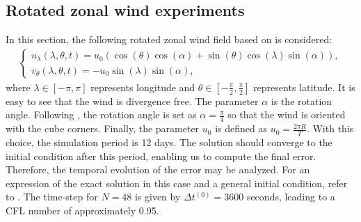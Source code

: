 \documentclass[preprint,12pt]{elsarticle}
\begin{document}
\begin{linenumbers}
\subsection{Rotated zonal wind experiments}
In this section, the following rotated zonal wind field based on \cite{will:1992} is considered:
\begin{align}
	\label{zonal-wind}
	\begin{cases}
		u_\lambda(\lambda,\theta,t) = u_0(\cos(\theta)\cos(\alpha) + \sin(\theta)\cos(\lambda)\sin(\alpha)),\\
		v_\theta(\lambda,\theta,t) = -u_0\sin(\lambda)\sin(\alpha),
	\end{cases}
\end{align}
where $\lambda \in [-\pi,\pi]$ represents longitude and $\theta \in [-\frac{\pi}{2},\frac{\pi}{2}]$ represents latitude. 
It is easy to see that the wind is divergence free.
The parameter $\alpha$ is the rotation angle. Following \cite{putman:2007}, the rotation angle is set as $\alpha=\frac{\pi}{4}$ so that the wind is oriented with the cube corners. 
Finally, the parameter $u_0$ is defined as $u_0 = \frac{2\pi R}{T}$.
With this choice, the simulation period is 12 days. The solution should converge to the initial condition after this period, enabling us to compute the final error.
Therefore, the temporal evolution of the error may be analyzed.
For an expression of the exact solution in this case and a general initial condition, refer to \cite[Theorem 5.1, p. 155]{brachet:2018}.
The time-step for $N=48$ is given by $\Delta t^{(0)} = 3600$ seconds, leading to a CFL number of approximately 0.95. 


\end{linenumbers}
\end{document}
